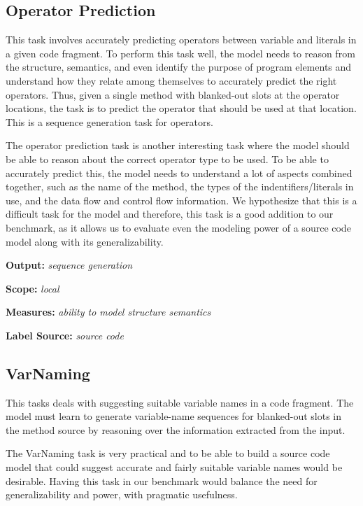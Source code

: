 \documentclass[sigplan,review,anonymous]{acmart}\settopmatter{printfolios=true,printccs=false,printacmref=false}
\begin{document}
\subsection{Operator Prediction}
This task involves accurately predicting operators between variable and literals in a given code fragment. To perform this task well, the model needs to reason from the structure, semantics, and even identify the purpose of program elements and understand how they relate among themselves to accurately predict the right operators. Thus, given a single method with blanked-out slots at the operator locations, the task is to predict the operator that should be used at that location. This is a sequence generation task for operators. 

The operator prediction task is another interesting task where the model should be able to reason about the correct operator type to be used. To be able to accurately predict this, the model needs to understand a lot of aspects combined together, such as the name of the method, the types of the indentifiers/literals in use, and the data flow and control flow information. We hypothesize that this is a difficult task for the model and therefore, this task is a good addition to our benchmark, as it allows us to evaluate even the modeling power of a source code model along with its generalizability. \newline

\noindent
\textbf{Output:} \textit{sequence generation}

\noindent
\textbf{Scope:} \textit{local}

\noindent
\textbf{Measures:} \textit{ability to model structure semantics}

\noindent
\textbf{Label Source:} \textit{source code}

\subsection{VarNaming}
This tasks deals with suggesting suitable variable names in a code fragment. The model must learn to generate variable-name sequences for blanked-out slots in the method source by reasoning over the information extracted from the input. 

The VarNaming task is very practical and to be able to build a source code model that could suggest accurate and fairly suitable variable names would be desirable. Having this task in our benchmark would balance the need for generalizability and power, with pragmatic usefulness. \newline
\end{document}
